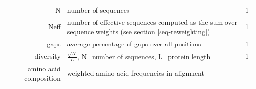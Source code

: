 \documentclass[11pt,a4paper,twoside]{book}
\theoremstyle{definition}
\theoremstyle{definition}
\theoremstyle{remark}
\begin{document}
\begin{longtable}[]{@{}rlc@{}}
\begin{minipage}[t]{0.23\columnwidth}\raggedleft\strut
N\strut
\end{minipage} & \begin{minipage}[t]{0.50\columnwidth}\raggedright\strut
number of sequences\strut
\end{minipage} & \begin{minipage}[t]{0.18\columnwidth}\centering\strut
1\strut
\end{minipage}\tabularnewline
\begin{minipage}[t]{0.23\columnwidth}\raggedleft\strut
Neff\strut
\end{minipage} & \begin{minipage}[t]{0.50\columnwidth}\raggedright\strut
number of effective sequences computed as the sum over sequence weights
(see section \ref{seq-reweighting})\strut
\end{minipage} & \begin{minipage}[t]{0.18\columnwidth}\centering\strut
1\strut
\end{minipage}\tabularnewline
\begin{minipage}[t]{0.23\columnwidth}\raggedleft\strut
gaps\strut
\end{minipage} & \begin{minipage}[t]{0.50\columnwidth}\raggedright\strut
average percentage of gaps over all positions\strut
\end{minipage} & \begin{minipage}[t]{0.18\columnwidth}\centering\strut
1\strut
\end{minipage}\tabularnewline
\begin{minipage}[t]{0.23\columnwidth}\raggedleft\strut
diversity\strut
\end{minipage} & \begin{minipage}[t]{0.50\columnwidth}\raggedright\strut
\(\frac{\sqrt{N}}{L}\), N=number of sequences, L=protein length\strut
\end{minipage} & \begin{minipage}[t]{0.18\columnwidth}\centering\strut
1\strut
\end{minipage}\tabularnewline
\begin{minipage}[t]{0.23\columnwidth}\raggedleft\strut
amino acid composition\strut
\end{minipage} & \begin{minipage}[t]{0.50\columnwidth}\raggedright\strut
weighted amino acid frequencies in alignment\strut
\end{minipage} & \begin{minipage}[t]{0.18\columnwidth}\centering\strut

\end{minipage}
\end{longtable}
\end{document}
